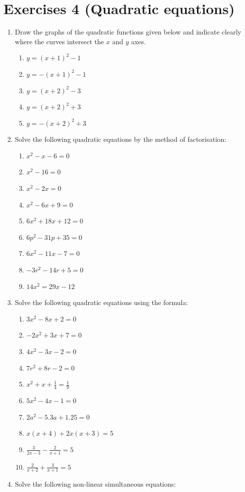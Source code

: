 \documentclass[
  12pt,
  oneside]{book}
\providecommand{\tightlist}{%
  \setlength{\itemsep}{0pt}\setlength{\parskip}{0pt}}
\theoremstyle{definition}
\theoremstyle{definition}
\theoremstyle{definition}
\theoremstyle{definition}
\theoremstyle{remark}
\begin{document}
\hypertarget{exercises-4-quadratic-equations}{%
\chapter*{Exercises 4 (Quadratic equations)}\label{exercises-4-quadratic-equations}}

\begin{enumerate}
\def\labelenumi{\arabic{enumi}.}
\item
  Draw the graphs of the quadratic functions given below and indicate clearly where the curves intersect the \(x\) and \(y\) axes.

  \begin{enumerate}
  \def\labelenumii{\roman{enumii})}
  \tightlist
  \item
    \(y=(x+1)^2-1\)
  \item
    \(y=-(x+1)^2-1\)
  \item
    \(y=(x+2)^2-3\)
  \item
    \(y=(x+2)^2+3\)
  \item
    \(y=-(x+2)^2+3\)
  \end{enumerate}
\item
  Solve the following quadratic equations by the method of factorisation:

  \begin{enumerate}
  \def\labelenumii{\roman{enumii})}
  \tightlist
  \item
    \(x^2-x-6=0\)
  \item
    \(x^2-16=0\)
  \item
    \(x^2-2x=0\)
  \item
    \(x^2-6x+9=0\)
  \item
    \(6x^2+18x+12=0\)
  \item
    \(6p^2-31p+35=0\)
  \item
    \(6x^2-11x-7=0\)
  \item
    \(-3r^2-14r+5=0\)
  \item
    \(14x^2=29x-12\)
  \end{enumerate}
\item
  Solve the following quadratic equations using the formula:

  \begin{enumerate}
  \def\labelenumii{\roman{enumii})}
  \tightlist
  \item
    \(3x^2-8x+2=0\)
  \item
    \(-2x^2+3x+7=0\)
  \item
    \(4x^2-3x-2=0\)
  \item
    \(7r^2+8r-2=0\)
  \item
    \(x^2+x+\frac14=\frac19\)
  \item
    \(5x^2-4x-1=0\)
  \item
    \(2a^2-5.3a+1.25=0\)
  \item
    \(x(x+4)+2x(x+3)=5\)
  \item
    \(\frac{3}{2x-3}-\frac{2}{x+1}=5\)
  \item
    \(\frac{2}{x+2}+\frac{3}{x+1}=5\)
  \end{enumerate}
\item
  Solve the following non-linear simultaneous equations:


\end{enumerate}
\end{document}

